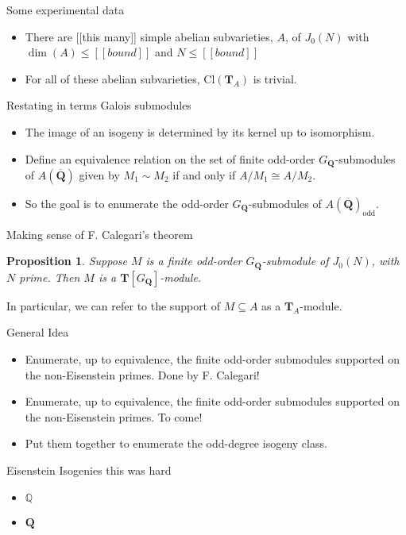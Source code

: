 \documentclass{beamer}
\newtheorem{proposition}[theorem]{Proposition}
\newcommand{\QQ}{\mathbf{Q}}
\newcommand{\QQbar}{\overline{\mathbf{Q}}}
\newcommand{\TT}{\mathbf{T}}
\newcommand{\Cl}{\mathrm{Cl}}
\begin{document}
\begin{frame}{Some experimental data}
    \begin{itemize}
        \item 
            There are [[this many]] simple abelian subvarieties, $A$, of
            $J_0(N)$ with $\dim(A)\leq [[bound]]$ and $N\leq [[bound]]$
        \item
            For all of these abelian subvarieties, $\Cl(\TT_A)$ is trivial.
    \end{itemize} 
\end{frame}

\begin{frame}{Restating in terms Galois submodules}
    \begin{itemize}
        \item 
            The image of an isogeny is determined by its kernel up to isomorphism. 
        \item
            Define an equivalence relation on the set of finite odd-order
            $G_\QQ$-submodules of $A(\QQbar)$ given by $M_1\sim M_2$ if and only if
            $A/M_1\cong A/M_2$.
        \item
            So the goal is to enumerate the odd-order $G_\QQ$-submodules of
            $A(\QQbar)_\mathrm{odd}$.
    \end{itemize}
\end{frame}

\begin{frame}{Making sense of F. Calegari's theorem}
    \begin{proposition}
        Suppose $M$ is a finite odd-order $G_\QQ$-submodule of $J_0(N)$, with $N$
        prime. Then $M$ is a $\TT[G_\QQ]$-module.
    \end{proposition}

    In particular, we can refer to the support of $M\subseteq A$ as a
    $\TT_A$-module.
\end{frame}

\begin{frame}{General Idea}
    \begin{itemize}
        \item 
            Enumerate, up to equivalence, the finite odd-order submodules
            supported on the non-Eisenstein primes. Done by F. Calegari!
        \item
            Enumerate, up to equivalence, the finite odd-order submodules
            supported on the non-Eisenstein primes. To come!
        \item
            Put them together to enumerate the odd-degree isogeny class.
    \end{itemize}
\end{frame}

\begin{frame}{Eisenstein Isogenies}
    this was hard
    \begin{itemize}
        \item 
            $\mathbb{Q}$
        \item
            $\mathbf{Q}$
    \end{itemize}
\end{frame}

    
\end{document}
